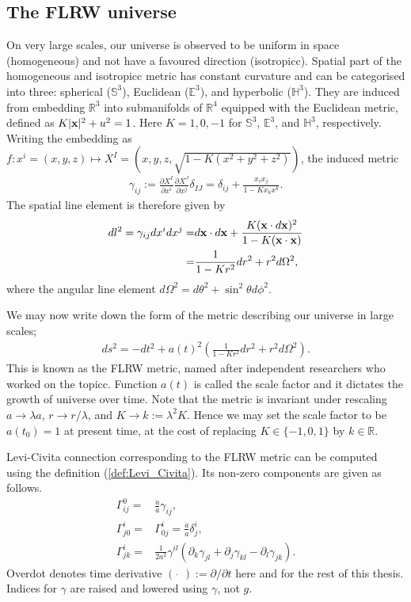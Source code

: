 \subsection{The FLRW universe}
On very large scales, our universe is observed to be uniform in space (homogeneous) and not have a favoured direction (isotropicc). Spatial part of the homogeneous and isotropicc metric has constant curvature and can be categorised into three: spherical ($\mathbb{S}^3$), Euclidean ($\mathbb{E}^3$), and hyperbolic ($\mathbb{H}^3$). They are induced from embedding $\mathbb{R}^3$ into submanifolds of $\mathbb{R}^4$ equipped with the Euclidean metric, defined as $K|\mathbf{x}|^2 + u^2 = 1$. Here $K=1,0,-1$ for $\mathbb{S}^3$, $\mathbb{E}^3$, and $\mathbb{H}^3$, respectively. Writing the embedding as $f: x^i = (x,y,z) \mapsto X^I =(x,y,z,\sqrt{1-K(x^2+y^2+z^2)})$, the induced metric
\begin{align}
	\gamma_{ij} := \frac{\partial X^I}{\partial x^i} \frac{\partial X^J}{\partial x^j} \delta_{IJ}
	= \delta_{ij} + \frac{x_i x_j}{1-Kx_k x^k}. \label{eqn:FLRW_metric_spatial}
\end{align}
The spatial line element is therefore given by
\begin{align}
	dl^2 = \gamma_{ij} dx^i dx^j =& d\mathbf{x} \cdot d\mathbf{x} + \frac{K(\mathbf{x} \cdot d\mathbf{x})^2}{1-K (\mathbf{x} \cdot \mathbf{x})} \\
	=& \frac{1}{1-Kr^2} dr^2 + r^2 d\Omega^2,
\end{align}
where the angular line element $d\Omega^2 = d\theta^2 + \sin^2\theta d\phi^2$.

We may now write down the form of the metric describing our universe in large scales;
\begin{align}
	ds^2 = - dt^2 + a(t)^2 \left( \frac{1}{1-Kr^2} dr^2 + r^2 d\Omega^2 \right).
\end{align}
This is known as the FLRW metric, named after independent researchers who worked on the topicc. Function $a(t)$ is called the scale factor and it dictates the growth of universe over time. Note that the metric is invariant under rescaling $a \rightarrow \lambda a$, $r \rightarrow r / \lambda$, and $K \rightarrow k:= \lambda^2 K$. Hence we may set the scale factor to be $a(t_0) = 1$ at present time, at the cost of replacing $K \in \{-1,0,1\}$ by $k \in \mathbb{R}$.

Levi-Civita connection corresponding to the FLRW metric can be computed using the definition (\ref{def:Levi_Civita}). Its non-zero components are given as follows.
\begin{align}
	\Gamma^0_{ij} =& \frac{\dot{a}}{a} \gamma_{ij}, \label{eqn:homogenous_christoffel_1}\\
	\Gamma^i_{j0} =& \Gamma^i_{0j} = \frac{\dot{a}}{a} \delta^i_j, \label{eqn:homogenous_christoffel_2}\\
	\Gamma^i_{jk} =& \frac{1}{2a^2} \gamma^{il} \left( \partial_k \gamma_{jl} + \partial_j \gamma_{kl} - \partial_l \gamma_{jk} \right).  \label{eqn:homogenous_christoffel_3}
\end{align}
Overdot denotes time derivative $(\,\, \dot{} \,\,) := \partial/\partial t$ here and for the rest of this thesis. Indices for $\gamma$ are raised and lowered using $\gamma$, not $g$.

